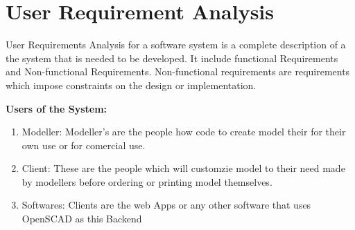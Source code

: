 \section{User Requirement Analysis} 
User Requirements Analysis for a software system is a complete description of a the system that is needed to be developed. It include functional Requirements
and Non-functional Requirements. Non-functional requirements are 
requirements which impose constraints on the design or implementation.


{\bf Users of the System:}
	\begin{enumerate}
		\item Modeller: Modeller's are the people how code to create model their for their own use or for comercial use.
		\item Client: These are the people which will customzie model to their need made by modellers before ordering or printing model themselves. 
		\item Softwares: Clients are the web Apps or any other software that uses OpenSCAD as this Backend
		 		
	\end{enumerate}

